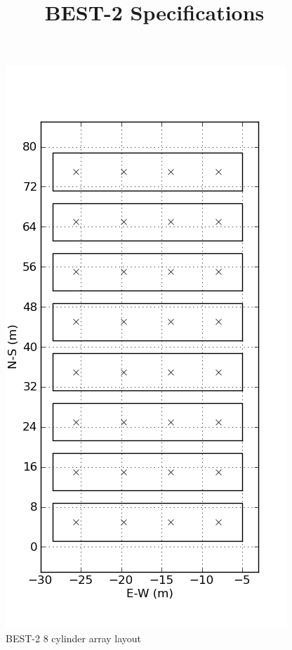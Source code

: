 \documentclass[useAMS]{mn2e}
\title[]{BEST-2 Specifications}
\begin{document}
\pagerange{\pageref{firstpage}--\pageref{lastpage}} 

\maketitle


\begin{figure}
    \centering
    \includegraphics[scale=0.4]{layout.png}
    \caption{BEST-2 8 cylinder array layout}
\end{figure}
\end{document}
